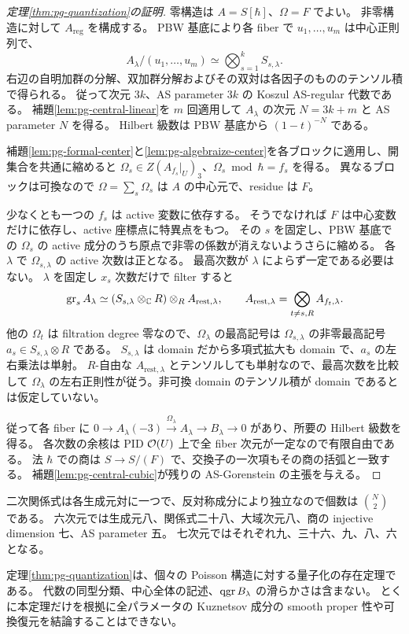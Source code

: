 \begin{proof}[定理\ref{thm:pg-quantization}の証明]
零構造は $A=S[\hbar]$、$\Omega=F$ でよい。
非零構造に対して $A_{\mathrm{reg}}$ を構成する。
PBW 基底により各 fiber で $u_1,\ldots,u_m$ は中心正則列で、
\[
A_\lambda/(u_1,\ldots,u_m)\simeq\bigotimes_{s=1}^kS_{s,\lambda}.
\]
右辺の自明加群の分解、双加群分解およびその双対は各因子のもののテンソル積で得られる。
従って次元 $3k$、AS parameter $3k$ の Koszul AS-regular 代数である。
補題\ref{lem:pg-central-linear}を $m$ 回適用して $A_\lambda$ の次元 $N=3k+m$ と AS parameter $N$ を得る。
Hilbert 級数は PBW 基底から $(1-t)^{-N}$ である。

補題\ref{lem:pg-formal-center}と\ref{lem:pg-algebraize-center}を各ブロックに適用し、開集合を共通に縮めると
$\Omega_s\in Z(A_{f_s}|_U)_3$、$\Omega_s\bmod\hbar=f_s$ を得る。
異なるブロックは可換なので $\Omega=\sum_s\Omega_s$ は $A$ の中心元で、residue は $F$。

少なくとも一つの $f_s$ は active 変数に依存する。
そうでなければ $F$ は中心変数だけに依存し、active 座標点に特異点をもつ。
その $s$ を固定し、PBW 基底での $\Omega_s$ の active 成分のうち原点で非零の係数が消えないようさらに縮める。
各 $\lambda$ で $\Omega_{s,\lambda}$ の active 次数は正となる。
最高次数が $\lambda$ によらず一定である必要はない。
$\lambda$ を固定し $x_s$ 次数だけで filter すると
\[
\operatorname{gr}_sA_\lambda\simeq
(S_{s,\lambda}\otimes_\mathbb C R)\otimes_R A_{\mathrm{rest},\lambda},
\qquad A_{\mathrm{rest},\lambda}=\bigotimes_{t\neq s,R}A_{f_t,\lambda}.
\]
他の $\Omega_t$ は filtration degree 零なので、$\Omega_\lambda$ の最高記号は
$\Omega_{s,\lambda}$ の非零最高記号 $a_s\in S_{s,\lambda}\otimes R$ である。
$S_{s,\lambda}$ は domain だから多項式拡大も domain で、$a_s$ の左右乗法は単射。
$R$-自由な $A_{\mathrm{rest},\lambda}$ とテンソルしても単射なので、最高次数を比較して
$\Omega_\lambda$ の左右正則性が従う。非可換 domain のテンソル積が domain であるとは仮定していない。

従って各 fiber に
$0\to A_\lambda(-3)\xrightarrow{\Omega_\lambda}A_\lambda\to B_\lambda\to0$
があり、所要の Hilbert 級数を得る。
各次数の余核は PID $\mathcal O(U)$ 上で全 fiber 次元が一定なので有限自由である。
法 $\hbar$ での商は $S\to S/(F)$ で、交換子の一次項もその商の括弧と一致する。
補題\ref{lem:pg-central-cubic}が残りの AS-Gorenstein の主張を与える。
\end{proof}
二次関係式は各生成元対に一つで、反対称成分により独立なので個数は $\binom N2$ である。
六次元では生成元八、関係式二十八、大域次元八、商の injective dimension 七、AS parameter 五。
七次元ではそれぞれ九、三十六、九、八、六となる。
\begin{remark}\label{rem:pg-quantization-scope}
定理\ref{thm:pg-quantization}は、個々の Poisson 構造に対する量子化の存在定理である。
代数の同型分類、中心全体の記述、$\operatorname{qgr} B_\lambda$ の滑らかさは含まない。
とくに本定理だけを根拠に全パラメータの Kuznetsov 成分の smooth proper 性や可換復元を結論することはできない。
\end{remark}

